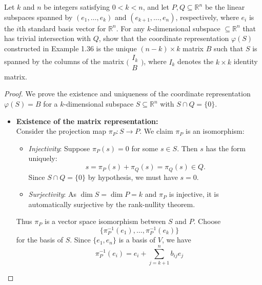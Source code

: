 \begin{problem}
  Let $k$ and $n$ be integers satisfying $0 < k < n$, and let $P, Q \subseteq \mathbb{R}^n$ be the linear subspaces spanned by $(e_1,\dots,e_k)$ and $(e_{k+1},\dots,e_n)$, respectively, where $e_i$ is the $i$th standard basis vector for $\mathbb{R}^n$. For any $k$-dimensional subspace $\subseteq \mathbb{R}^n$ that has trivial intersection with $Q$, show that the coordinate representation $\varphi(S)$ constructed in Example 1.36 is the unique $(n-k) \times k$ matrix $B$ such that $S$ is spanned by the columns of the matrix $\bigl(
    \begin{smallmatrix} I_k \\ B \end{smallmatrix}
    \bigr)$, where $I_k$ denotes the $k \times k$ identity matrix.
    \begin{proof}
      We prove the existence and uniqueness of the coordinate representation $\varphi(S) = B$ for a $k$-dimensional subspace $S \subseteq \mathbb{R}^n$ with $S \cap Q = \{0\}$.
      \begin{itemize}
        \item \textbf{Existence of the matrix representation:} \\
        Consider the projection map $\pi_P\colon S \to P$. We claim $\pi_P$ is an isomorphism:
        \begin{itemize}
          \item \textit{Injectivity}: Suppose $\pi_P(s) = 0$ for some $s \in S$. Then $s$ has the form uniquely:
          \begin{equation*}
            s = \pi_P(s) + \pi_Q(s) = \pi_Q(s) \in Q.
          \end{equation*}
          Since $S \cap Q = \{0\}$ by hypothesis, we must have $s = 0$.
          \item \textit{Surjectivity}: As $\dim S = \dim P = k$ and $\pi_P$ is injective, it is automatically surjective by the rank-nullity theorem.
        \end{itemize}
          Thus $\pi_P$ is a vector space isomorphism between $S$ and $P$. Choose 
          \begin{equation*}
            \{\pi_P^{-1}(e_1), \dots, \pi_P^{-1}(e_k)\}
          \end{equation*}
          for the basis of $S$. Since $\{e_1, e_n\}$ is a basis of $V$, we have
          \begin{equation*}
            \pi_P^{-1}(e_i) = e_i + \sum_{j=k+1}^{n}b_{ij}e_j
          \end{equation*}

\end{itemize}
\end{proof}
\end{problem}
